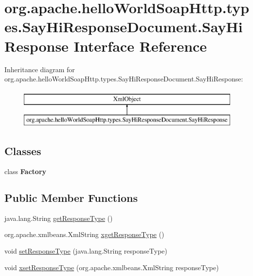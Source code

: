 \hypertarget{interfaceorg_1_1apache_1_1hello_world_soap_http_1_1types_1_1_say_hi_response_document_1_1_say_hi_response}{}\section{org.\+apache.\+hello\+World\+Soap\+Http.\+types.\+Say\+Hi\+Response\+Document.\+Say\+Hi\+Response Interface Reference}
\label{interfaceorg_1_1apache_1_1hello_world_soap_http_1_1types_1_1_say_hi_response_document_1_1_say_hi_response}
Inheritance diagram for org.\+apache.\+hello\+World\+Soap\+Http.\+types.\+Say\+Hi\+Response\+Document.\+Say\+Hi\+Response\+:\begin{figure}[H]
\begin{center}
\leavevmode
\includegraphics[height=2.000000cm]{interfaceorg_1_1apache_1_1hello_world_soap_http_1_1types_1_1_say_hi_response_document_1_1_say_hi_response}
\end{center}
\end{figure}
\subsection*{Classes}
\begin{DoxyCompactItemize}
\item 
class {\bfseries Factory}
\end{DoxyCompactItemize}
\subsection*{Public Member Functions}
\begin{DoxyCompactItemize}
\item 
java.\+lang.\+String \hyperlink{interfaceorg_1_1apache_1_1hello_world_soap_http_1_1types_1_1_say_hi_response_document_1_1_say_hi_response_a6a2cdea6b683d9441f5b49f675bfb497}{get\+Response\+Type} ()
\item 
org.\+apache.\+xmlbeans.\+Xml\+String \hyperlink{interfaceorg_1_1apache_1_1hello_world_soap_http_1_1types_1_1_say_hi_response_document_1_1_say_hi_response_aaba960279804d3aa3375aba80a03a185}{xget\+Response\+Type} ()
\item 
void \hyperlink{interfaceorg_1_1apache_1_1hello_world_soap_http_1_1types_1_1_say_hi_response_document_1_1_say_hi_response_af2890fb7018503f11f56e7e767e14dd6}{set\+Response\+Type} (java.\+lang.\+String response\+Type)
\item 
void \hyperlink{interfaceorg_1_1apache_1_1hello_world_soap_http_1_1types_1_1_say_hi_response_document_1_1_say_hi_response_a3c884752c9d470d205149b1245556139}{xset\+Response\+Type} (org.\+apache.\+xmlbeans.\+Xml\+String response\+Type)
\end{DoxyCompactItemize}
